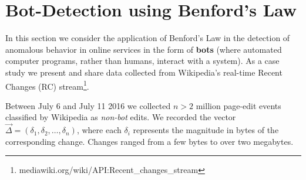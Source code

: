 \documentclass[twoside,leqno,twocolumn]{article}\usepackage[]{graphicx}\usepackage[]{color}
\begin{document}

\section{Bot-Detection using Benford's Law}
\label{sec:bot-detection-using-benfords-law}

In this section we consider the application of Benford's Law in the detection of anomalous behavior in online services in the form of \textbf{bots} (where automated computer programs, rather than humans, interact with a system). As a case study we present and share data collected from Wikipedia's real-time Recent Changes (RC) stream\footnote{mediawiki.org/wiki/API:Recent\_changes\_stream}. 

Between July 6 and July 11 2016 we collected $n>2$ million page-edit events classified by Wikipedia as \textit{non-bot} edits. We recorded the vector $\vec{\Delta}=\left(\delta_1, \delta_2, \ldots, \delta_n\right)$, where each $\delta_i$ represents the magnitude in bytes of the corresponding change. Changes ranged from a few bytes to over two megabytes. 

% 
\end{document}
